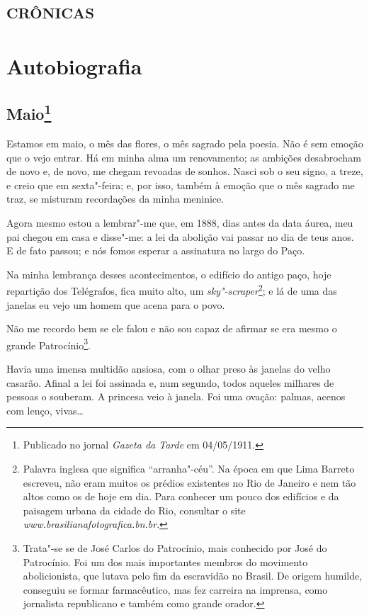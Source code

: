 \part{\textsc{crônicas}}

\part{Autobiografia}

\chapter[Maio]{Maio\footnote[*]{Publicado no jornal \emph{Gazeta da Tarde} em 04/05/1911.}}

Estamos em maio, o mês das flores, o mês sagrado pela poesia. Não é sem
emoção que o vejo entrar. Há em minha alma um renovamento; as ambições
desabrocham de novo e, de novo, me chegam revoadas de sonhos. Nasci sob
o seu signo, a treze, e creio que em sexta"-feira; e, por isso, também à
emoção que o mês sagrado me traz, se misturam recordações da minha
meninice.

Agora mesmo estou a lembrar"-me que, em 1888, dias antes da data áurea,
meu pai chegou em casa e disse"-me: a lei da abolição vai passar no dia
de teus anos. E de fato passou; e nós fomos esperar a assinatura no
largo do Paço.

Na minha lembrança desses acontecimentos, o edifício do antigo paço,
hoje repartição dos Telégrafos, fica muito alto, um
\emph{sky"-scraper}\footnote{Palavra inglesa que significa
  ``arranha"-céu''. Na época em que Lima Barreto escreveu, não eram
  muitos os prédios existentes no Rio de Janeiro e nem tão altos como os
  de hoje em dia. Para conhecer um pouco dos edifícios e da paisagem
  urbana da cidade do Rio, consultar o site
  \emph{www.brasilianafotografica.bn.br}.};
e lá de uma das janelas eu vejo um homem que acena para o povo.

Não me recordo bem se ele falou e não sou capaz de afirmar se era mesmo
o grande Patrocínio\footnote{Trata"-se se de José Carlos do Patrocínio,
  mais conhecido por José do Patrocínio. Foi um dos mais importantes
  membros do movimento abolicionista, que lutava pelo fim da escravidão
  no Brasil. De origem humilde, conseguiu se formar farmacêutico, mas
  fez carreira na imprensa, como jornalista republicano e também como
  grande orador.}.

Havia uma imensa multidão ansiosa, com o olhar preso às janelas do velho
casarão. Afinal a lei foi assinada e, num segundo, todos aqueles
milhares de pessoas o souberam. A princesa veio à janela. Foi uma
ovação: palmas, acenos com lenço, vivas\ldots{}

